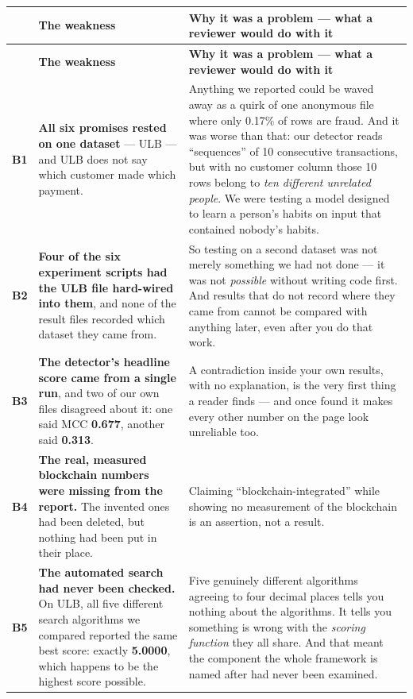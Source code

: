 \documentclass[11pt]{article}
\begin{document}
{\small
\renewcommand{\arraystretch}{1.25}
\begin{xltabular}{\linewidth}{@{}p{0.4cm} >{\raggedright\arraybackslash}p{4.9cm} X@{}}
\toprule
& \textbf{The weakness} & \textbf{Why it was a problem --- what a reviewer would do with it} \\
\midrule
\endfirsthead
\toprule
& \textbf{The weakness} & \textbf{Why it was a problem --- what a reviewer would do with it} \\
\midrule
\endhead
\textbf{B1} & \textbf{All six promises rested on one dataset} --- ULB --- and ULB does not say which customer made which payment. & Anything we reported could be waved away as a quirk of one anonymous file where only 0.17\% of rows are fraud. And it was worse than that: our detector reads ``sequences'' of 10 consecutive transactions, but with no customer column those 10 rows belong to \emph{ten different unrelated people}. We were testing a model designed to learn a person's habits on input that contained nobody's habits. \\
\textbf{B2} & \textbf{Four of the six experiment scripts had the ULB file hard-wired into them}, and none of the result files recorded which dataset they came from. & So testing on a second dataset was not merely something we had not done --- it was not \emph{possible} without writing code first. And results that do not record where they came from cannot be compared with anything later, even after you do that work. \\
\textbf{B3} & \textbf{The detector's headline score came from a single run}, and two of our own files disagreed about it: one said MCC \textbf{0.677}, another said \textbf{0.313}. & A contradiction inside your own results, with no explanation, is the very first thing a reader finds --- and once found it makes every other number on the page look unreliable too. \\
\textbf{B4} & \textbf{The real, measured blockchain numbers were missing from the report.} The invented ones had been deleted, but nothing had been put in their place. & Claiming ``blockchain-integrated'' while showing no measurement of the blockchain is an assertion, not a result. \\
\textbf{B5} & \textbf{The automated search had never been checked.} On ULB, all five different search algorithms we compared reported the same best score: exactly \textbf{5.0000}, which happens to be the highest score possible. & Five genuinely different algorithms agreeing to four decimal places tells you nothing about the algorithms. It tells you something is wrong with the \emph{scoring function} they all share. And that meant the component the whole framework is named after had never been examined. \\

\end{xltabular}}
\end{document}
